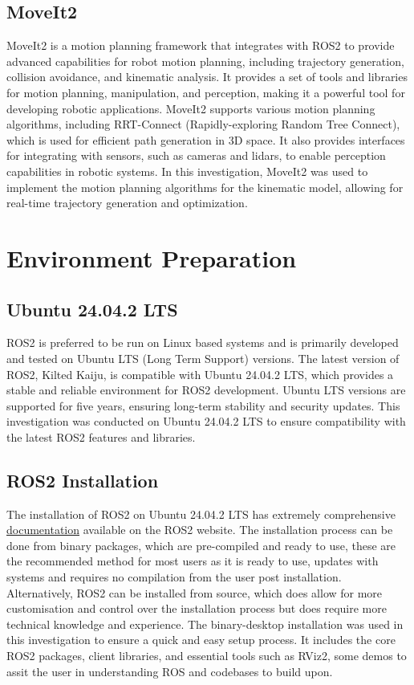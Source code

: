 \documentclass[10pt,a4paper,english]{article}
\begin{document}
\subsection{MoveIt2}
MoveIt2 is a motion planning framework that integrates with ROS2 to provide advanced capabilities for robot motion planning, including trajectory generation, collision avoidance, and kinematic analysis. It provides a set of tools and libraries for motion planning, manipulation, and perception, making it a powerful tool for developing robotic applications. MoveIt2 supports various motion planning algorithms, including RRT-Connect (Rapidly-exploring Random Tree Connect), which is used for efficient path generation in 3D space. It also provides interfaces for integrating with sensors, such as cameras and lidars, to enable perception capabilities in robotic systems. In this investigation, MoveIt2 was used to implement the motion planning algorithms for the kinematic model, allowing for real-time trajectory generation and optimization.

\newpage



\section{Environment Preparation}

\subsection{Ubuntu 24.04.2 LTS}
ROS2 is preferred to be run on Linux based systems and is primarily developed and tested on Ubuntu LTS (Long Term Support) versions. The latest version of ROS2, Kilted Kaiju, is compatible with Ubuntu 24.04.2 LTS, which provides a stable and reliable environment for ROS2 development. Ubuntu LTS versions are supported for five years, ensuring long-term stability and security updates. This investigation was conducted on Ubuntu 24.04.2 LTS to ensure compatibility with the latest ROS2 features and libraries.

\subsection{ROS2 Installation}
The installation of ROS2 on Ubuntu 24.04.2 LTS has extremely comprehensive \href{https://docs.ros.org/en/kilted/Installation.html}{documentation} available on the ROS2 website. The installation process can be done from binary packages, which are pre-compiled and ready to use, these are the recommended method for most users as it is ready to use, updates with systems and requires no compilation from the user post installation. Alternatively, ROS2 can be installed from source, which does allow for more customisation and control over the installation process but does require more technical knowledge and experience. The binary-desktop installation was used in this investigation to ensure a quick and easy setup process. It includes the core ROS2 packages, client libraries, and essential tools such as RViz2, some demos to assit the user in understanding ROS and codebases to build upon.
\end{document}
